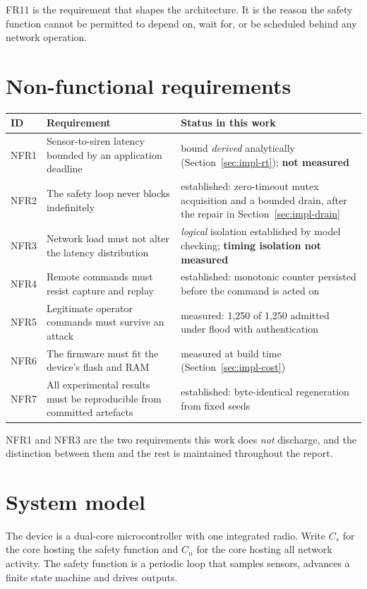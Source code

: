 FR11 is the requirement that shapes the architecture. It is the reason the safety function
cannot be permitted to depend on, wait for, or be scheduled behind any network operation.

\section{Non-functional requirements}

\begin{longtable}{@{}p{}p{}p{}@{}}
\toprule
\textbf{ID} & \textbf{Requirement} & \textbf{Status in this work} \\
\midrule
\endhead
NFR1 & Sensor-to-siren latency bounded by an application deadline & bound \emph{derived}
analytically (Section~\ref{sec:impl-rt}); \textbf{not measured} \\
NFR2 & The safety loop never blocks indefinitely & established: zero-timeout mutex acquisition
and a bounded drain, after the repair in Section~\ref{sec:impl-drain} \\
NFR3 & Network load must not alter the latency distribution & \emph{logical} isolation
established by model checking; \textbf{timing isolation not measured} \\
NFR4 & Remote commands must resist capture and replay & established: monotonic counter
persisted before the command is acted on \\
NFR5 & Legitimate operator commands must survive an attack & measured: 1,250 of 1,250 admitted
under flood with authentication \\
NFR6 & The firmware must fit the device's flash and RAM & measured at build time
(Section~\ref{sec:impl-cost}) \\
NFR7 & All experimental results must be reproducible from committed artefacts & established:
byte-identical regeneration from fixed seeds \\
\bottomrule
\end{longtable}

NFR1 and NFR3 are the two requirements this work does \emph{not} discharge, and the distinction
between them and the rest is maintained throughout the report.

\section{System model}

The device is a dual-core microcontroller with one integrated radio. Write $C_{s}$ for the core
hosting the safety function and $C_{n}$ for the core hosting all network activity. The safety
function is a periodic loop that samples sensors, advances a finite state machine and drives
outputs.

